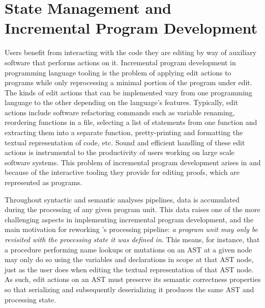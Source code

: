 \section{State Management and Incremental Program Development}\label{section:intro-state-management}

Users benefit from interacting with the code they are editing by way of auxiliary software that performs actions on it.
Incremental program development in programming language tooling is the problem of applying edit actions to programs while only reprocessing a minimal portion of the program under edit.
The kinds of edit actions that can be implemented vary from one programming language to the other depending on the language's features.
Typically, edit actions include software refactoring commands such as variable renaming, reordering functions in a file, selecting a list of statements from one function and extracting them into a separate function, pretty-printing and formatting the textual representation of code, etc.
Sound and efficient handling of these edit actions is instrumental to the productivity of users working on large scale software systems.
This problem of incremental program development arises in \Beluga and \Harpoon because of the interactive tooling they provide for editing proofs, which are represented as programs.


Throughout syntactic and semantic analyses pipelines, data is accumulated during the processing of any given program unit.
This data raises one of the more challenging aspects in implementing incremental program development, and the main motivation for reworking \Beluga's processing pipeline: \textit{a program unit may only be revisited with the processing state it was defined in}.
This means, for instance, that a procedure performing name lookups or mutations on an \ac{AST} at a given node may only do so using the variables and declarations in scope at that \ac{AST} node, just as the user does when editing the textual representation of that \ac{AST} node.
As such, edit actions on an \ac{AST} must preserve its semantic correctness properties so that serializing and subsequently deserializing it produces the same \ac{AST} and processing state.


